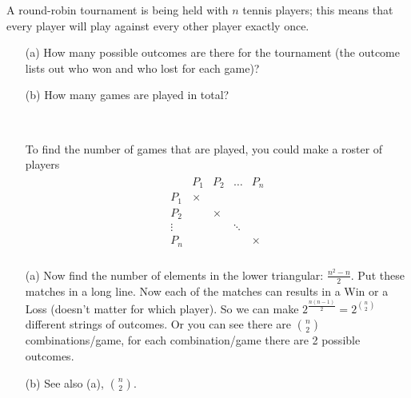 

\setcounter{theorem}{3}
\begin{exercise}[BH.4]
	A round-robin tournament is being held with $n$ tennis players; this means that every player will play against every other player exactly once.
	\begin{enumerate}
		\item[(a)] How many possible outcomes are there for the tournament (the outcome lists out who won and who lost for each game)?
		\item[(b)] How many games are played in total?
	\end{enumerate}
\begin{solution}~
	\begin{enumerate}
		\item[] To find the number of games that are played, you could make a roster of players
		\begin{align*}
			\begin{array}{ccccc}
				&P_{1} & P_{2} &\ldots &P_{n}\\
				P_{1} & \times \\
				P_{2} & & \times \\
				\vdots&&&\ddots\\
				P_{n} & & & &\times\\
				\end{array}
		\end{align*}
		\item[(a)] Now find the number of elements in the lower triangular: $\frac{n^2-n}{2}$. Put these matches in a long line. Now each of the matches can results in a Win or a Loss (doesn't matter for which player). So we can make $2^{\frac{n(n-1)}{2}}=2^{n\choose 2 }$ different strings of outcomes. Or you can see there are $n\choose 2$ combinations/game, for each combination/game there are 2 possible outcomes. 
	\item[(b)] See also (a), $n\choose 2$.
	\end{enumerate}
\end{solution}
\end{exercise}

